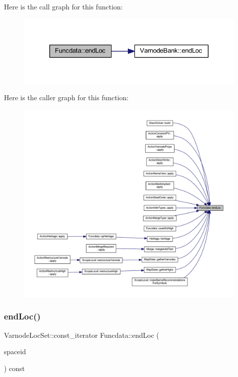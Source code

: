 Here is the call graph for this function\+:
\nopagebreak
\begin{figure}[H]
\begin{center}
\leavevmode
\includegraphics[width=324pt]{class_funcdata_a49f4e57094c47d431d81545f28172c1f_cgraph}
\end{center}
\end{figure}
Here is the caller graph for this function\+:
\nopagebreak
\begin{figure}[H]
\begin{center}
\leavevmode
\includegraphics[width=350pt]{class_funcdata_a49f4e57094c47d431d81545f28172c1f_icgraph}
\end{center}
\end{figure}
\mbox{\label{class_funcdata_a23bcf948b0b6306696e595b2464c746b}} 
\subsubsection{\texorpdfstring{endLoc()}{endLoc()}\hspace{0.1cm}{\footnotesize\ttfamily [2/6]}}
{\footnotesize\ttfamily Varnode\+Loc\+Set\+::const\+\_\+iterator Funcdata\+::end\+Loc (\begin{DoxyParamCaption}\item[{\mbox{\hyperlink{class_addr_space}{Addr\+Space}} $\ast$}]{spaceid }\end{DoxyParamCaption}) const\hspace{0.3cm}{\ttfamily [inline]}}



